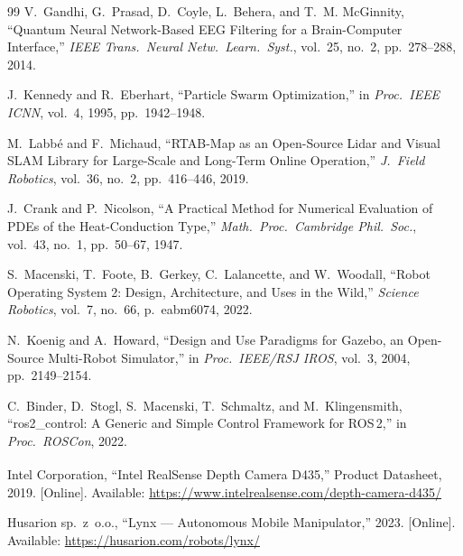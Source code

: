 \documentclass[conference]{IEEEtran}
\begin{document}
\begin{thebibliography}{99}
V.~Gandhi, G.~Prasad, D.~Coyle, L.~Behera, and T.~M. McGinnity, ``Quantum Neural
Network-Based EEG Filtering for a Brain-Computer Interface,'' \emph{IEEE Trans.\
Neural Netw.\ Learn.\ Syst.}, vol.~25, no.~2, pp.~278--288, 2014.

J.~Kennedy and R.~Eberhart, ``Particle Swarm Optimization,'' in
\emph{Proc.\ IEEE ICNN}, vol.~4, 1995, pp.~1942--1948.

M.~Labb\'{e} and F.~Michaud, ``RTAB-Map as an Open-Source Lidar and Visual SLAM
Library for Large-Scale and Long-Term Online Operation,'' \emph{J.\ Field
Robotics}, vol.~36, no.~2, pp.~416--446, 2019.

J.~Crank and P.~Nicolson, ``A Practical Method for Numerical Evaluation of PDEs of
the Heat-Conduction Type,'' \emph{Math.\ Proc.\ Cambridge Phil.\ Soc.}, vol.~43,
no.~1, pp.~50--67, 1947.

S.~Macenski, T.~Foote, B.~Gerkey, C.~Lalancette, and W.~Woodall,
``Robot Operating System 2: Design, Architecture, and Uses in the Wild,''
\emph{Science Robotics}, vol.~7, no.~66, p.~eabm6074, 2022.

N.~Koenig and A.~Howard, ``Design and Use Paradigms for Gazebo, an Open-Source
Multi-Robot Simulator,'' in \emph{Proc.\ IEEE/RSJ IROS}, vol.~3, 2004,
pp.~2149--2154.

C.~Binder, D.~Stogl, S.~Macenski, T.~Schmaltz, and M.~Klingensmith,
``ros2\_control: A Generic and Simple Control Framework for ROS\,2,''
in \emph{Proc.\ ROSCon}, 2022.

Intel Corporation, ``Intel\textsuperscript{\textregistered} RealSense\texttrademark{}
Depth Camera D435,'' Product Datasheet, 2019.
[Online]. Available: \url{https://www.intelrealsense.com/depth-camera-d435/}

Husarion sp.\ z~o.o., ``Lynx --- Autonomous Mobile Manipulator,'' 2023.
[Online]. Available: \url{https://husarion.com/robots/lynx/}

\end{thebibliography}
\end{document}
